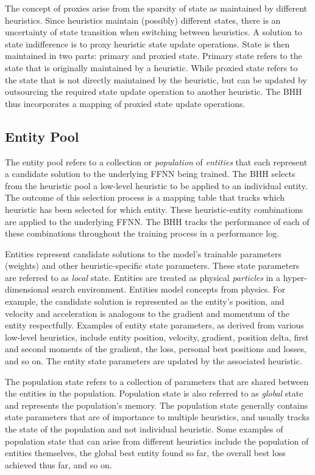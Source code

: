 The concept of proxies arise from the sparsity of state as maintained by different heuristics. Since heuristics maintain (possibly) different states, there is an uncertainty of state transition when switching between heuristics. A solution to state indifference is to proxy heuristic state update operations. State is then maintained in two parts: primary and proxied state. Primary state refers to the state that is originally maintained by a heuristic. While proxied state refers to the state that is not directly maintained by the heuristic, but can be updated by outsourcing the required state update operation to another heuristic. The \acs{BHH} thus incorporates a mapping of proxied state update operations.

\subsection{Entity Pool}\label{sec:bhh:entity_pool}

The entity pool refers to a collection or \textit{population} of \textit{entities} that each represent a candidate solution to the underlying \acs{FFNN} being trained. The \acs{BHH} selects from the heuristic pool a low-level heuristic to be applied to an individual entity. The outcome of this selection process is a mapping table that tracks which heuristic has been selected for which entity. These heuristic-entity combinations are applied to the underlying \acs{FFNN}. The \acs{BHH} tracks the performance of each of these combinations throughout the training process in a performance log.

Entities represent candidate solutions to the model's trainable parameters (weights) and other heuristic-specific state parameters. These state parameters are referred to as \textit{local} state. Entities are treated as physical \textit{particles} in a hyper-dimensional search environment. Entities model concepts from physics. For example, the candidate solution is represented as the entity's position, and velocity and acceleration is analogous to the gradient and momentum of the entity respectfully. Examples of entity state parameters, as derived from various low-level heuristics, include entity position, velocity, gradient, position delta, first and second moments of the gradient, the loss, personal best positions and losses, and so on. The entity state parameters are updated by the associated heuristic.

The population state refers to a collection of parameters that are shared between the entities in the population. Population state is also referred to as \textit{global} state and represents the population's memory. The population state generally contains state parameters that are of importance to multiple heuristics, and usually tracks the state of the population and not individual heuristic. Some examples of population state that can arise from different heuristics include the population of entities themselves, the global best entity found so far, the overall best loss achieved thus far, and so on.


